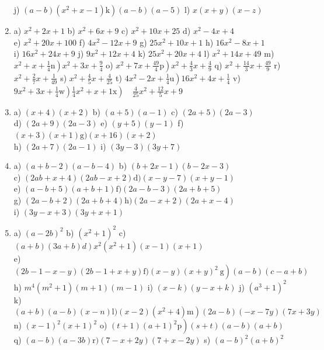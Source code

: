 \documentclass[10pt]{article}
\begin{document}
\begin{enumerate}
j) \(\left.(a-b)\left(x^{2}+x-1\right) \mathrm{k}\right)(a-b)(a-5)\) l) \(x(x+y)(x-z)\)
  \item a) \(x^{2}+2 x+1\) b) \(x^{2}+6 x+9\) c) \(x^{2}+10 x+25\) d) \(x^{2}-4 x+4\)\\
e) \(x^{2}+20 x+100\) f) \(4 x^{2}-12 x+9\) g) \(25 x^{2}+10 x+1\) h) \(16 x^{2}-8 x+1\)\\
i) \(16 x^{2}+24 x+9\) j) \(9 x^{2}+12 x+4\) k) \(25 x^{2}+20 x+4\) l) \(x^{2}+14 x+49\) m) \(\left.x^{2}+x+\frac{1}{4} \mathrm{n}\right) x^{2}+3 x+\frac{9}{4}\) o) \(\left.x^{2}+7 x+\frac{49}{4} \mathrm{p}\right) x^{2}+\frac{4}{3} x+\frac{4}{9}\) q) \(x^{2}+\frac{14}{3} x+\frac{49}{9}\) r) \(x^{2}+\frac{2}{7} x+\frac{1}{49}\) s) \(x^{2}+\frac{4}{5} x+\frac{4}{25}\) t) \(\left.4 x^{2}-2 x+\frac{1}{4} \mathrm{u}\right) 16 x^{2}+4 x+\frac{1}{4}\) v) \(\left.\left.9 x^{2}+3 x+\frac{1}{4} \mathrm{w}\right) \frac{1}{4} x^{2}+x+1 \mathrm{x}\right) \quad \frac{4}{25} x^{2}+\frac{12}{5} x+9\)
  \item a) \((x+4)(x+2)\) b) \((a+5)(a-1)\) c) \((2 a+5)(2 a-3)\)\\
d) \((2 a+9)(2 a-3)\) e) \((y+5)(y-1)\) f) \((x+3)(x+1) \mathrm{g})(x+16)(x+2)\)\\
h) \((2 a+7)(2 a-1)\) i) \((3 y-3)(3 y+7)\)
  \item a) \((a+b-2)(a-b-4)\) b) \((b+2 x-1)(b-2 x-3)\)\\
c) \((2 a b+x+4)(2 a b-x+2) \mathrm{d})(x-y-7)(x+y-1)\)\\
e) \((a-b+5)(a+b+1) \mathrm{f})(2 a-b-3)(2 a+b+5)\)\\
g) \((2 a-b+2)(2 a+b+4) \mathrm{h})(2 a-x+2)(2 a+x-4)\)\\
i) \((3 y-x+3)(3 y+x+1)\)
  \item a) \((a-2 b)^{2}\) b) \(\left(x^{2}+1\right)^{2}\) c) \(\left.(a+b)(3 a+b) d\right) x^{2}\left(x^{2}+1\right)(x-1)(x+1)\)\\
e) \(\left.(2 b-1-x-y)(2 b-1+x+y) \mathrm{f})(x-y)(x+y)^{2} \mathrm{~g}\right)(a-b)(c-a+b)\)\\
h) \(m^{4}\left(m^{2}+1\right)(m+1)(m-1)\) i) \((x-k)(y-x+k)\) j) \(\left(a^{3}+1\right)^{2}\)\\
k) \(\left.(a+b)(a-b)(x-n) \mathrm{l})(x-2)\left(x^{2}+4\right) \mathrm{m}\right)(2 a-b)(-x-7 y)(7 x+3 y)\)\\
n) \((x-1)^{2}(x+1)^{2}\) o) \(\left.(t+1)(a+1)^{2} \mathrm{p}\right)(s+t)(a-b)(a+b)\)\\
q) \((a-b)(a-3 b) \mathrm{r})(7-x+2 y)(7+x-2 y)\) s) \((a-b)^{2}(a+b)^{2}\)\\

\end{enumerate}
\end{document}
